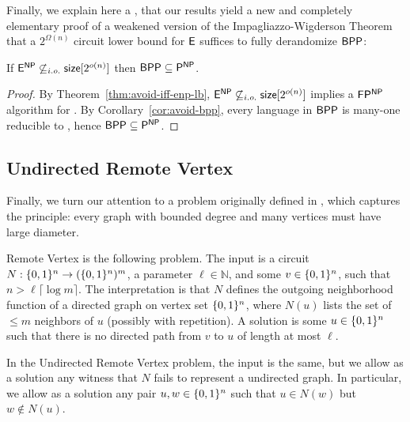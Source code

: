 Finally, we explain here a , that our results yield a new and completely elementary proof of a weakened version of the Impagliazzo-Wigderson Theorem that a $2^{\Omega(n)}$ circuit lower bound for $\cl{E}$ suffices to fully derandomize $\cl{BPP}$:
\begin{theorem}
If $\cl{E^{NP}} \not\subseteq_{i.o.} \cl{size}[2^{o(n)}]$ then $\cl{BPP} \subseteq \cl{P^{NP}}$.
\end{theorem}
\begin{proof}
By Theorem~\ref{thm:avoid-iff-enp-lb}, $\cl{E^{NP}} \not\subseteq_{i.o.} \cl{size}[2^{o(n)}]$ implies a $\cl{FP^{NP}}$ algorithm for \avoid. By Corollary~\ref{cor:avoid-bpp}, every language in $\cl{BPP}$ is many-one reducible to \avoid, hence $\cl{BPP} \subseteq \cl{P^{NP}}$.
\end{proof}

\subsection{ Undirected Remote Vertex}
Finally, we turn our attention to a problem originally defined in \cite{KKMP}, which captures the principle: every graph with bounded degree and many vertices must have large diameter.
\begin{definition}\label{range:def:remote-vertex}
{\sc Remote Vertex} is the following problem. The input is a circuit $N: \{0,1\}^n \to (\{0,1\}^n)^m$, a parameter $\ell \in \mathbb{N}$, and some $v \in \{0,1\}^n$, such that $n > \ell \lceil \log m \rceil$. The interpretation is that $N$ defines the outgoing neighborhood function of a directed graph on vertex set $\{0,1\}^n$, where $N(u)$ lists the set of $\leq m$ neighbors of $u$ (possibly with repetition). A solution is some $u \in \{0,1\}^n$ such that there is no directed path from $v$ to $u$ of length at most $\ell$.

In the {\sc Undirected Remote Vertex} problem, the input is the same, but we allow as a solution any witness that $N$ fails to represent a undirected graph. In particular, we allow as a solution any pair $u,w \in \{0,1\}^n$ such that $u \in N(w)$ but $w \notin N(u)$. 
\end{definition}

